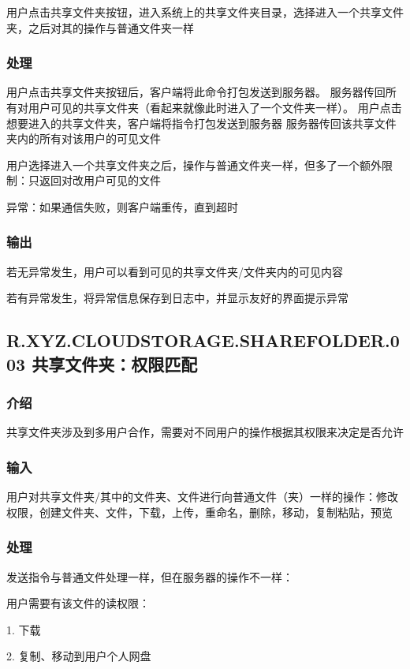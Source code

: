 用户点击共享文件夹按钮，进入系统上的共享文件夹目录，选择进入一个共享文件夹，之后对其的操作与普通文件夹一样

\subsubsection{处理} 

用户点击共享文件夹按钮后，客户端将此命令打包发送到服务器。
服务器传回所有对用户可见的共享文件夹（看起来就像此时进入了一个文件夹一样）。
用户点击想要进入的共享文件夹，客户端将指令打包发送到服务器
服务器传回该共享文件夹内的所有对该用户的可见文件

用户选择进入一个共享文件夹之后，操作与普通文件夹一样，但多了一个额外限制：只返回对改用户可见的文件

异常：如果通信失败，则客户端重传，直到超时
 
\subsubsection{输出} 
若无异常发生，用户可以看到可见的共享文件夹/文件夹内的可见内容

若有异常发生，将异常信息保存到日志中，并显示友好的界面提示异常


\subsection{R.XYZ.CLOUDSTORAGE.SHAREFOLDER.003 共享文件夹：权限匹配}
 
\subsubsection{介绍}
共享文件夹涉及到多用户合作，需要对不同用户的操作根据其权限来决定是否允许

\subsubsection{输入} 
用户对共享文件夹/其中的文件夹、文件进行向普通文件（夹）一样的操作：修改权限，创建文件夹、文件，下载，上传，重命名，删除，移动，复制粘贴，预览

\subsubsection{处理} 
发送指令与普通文件处理一样，但在服务器的操作不一样：

用户需要有该文件的读权限：

1. 下载

2. 复制、移动到用户个人网盘

